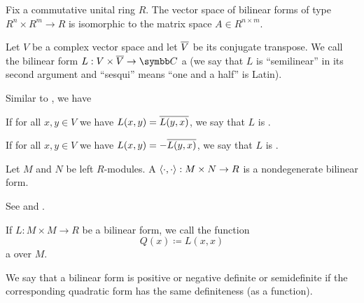 \begin{corollary}\label{thm:bilinear_forms_isomorphic_to_matrices}
  Fix a commutative unital ring \( R \). The vector space of bilinear forms of type \( R^n \times R^m \to R \) is isomorphic to the matrix space \( A \in R^{n \times m} \).
\end{corollary}

\begin{definition}\label{def:sesquilinear_form}\cite[258]{Knapp2016BAlg}
  Let \( V \) be a complex vector space and let \( \overline{V} \) be its conjugate transpose. We call the bilinear form \( L: V \times \Ol V \to \BC \) a  (we say that \( L \) is \enquote{semilinear} in its second argument and \enquote{sesqui} means \enquote{one and a half} is Latin).

  Similar to , we have
  \begin{defenum}
     If for all \( x, y \in V \) we have \( L(x, y) = \overline{L(y, x)} \), we say that \( L \) is .

     If for all \( x, y \in V \) we have \( L(x, y) = -\overline{L(y, x)} \), we say that \( L \) is .
  \end{defenum}
\end{definition}

\begin{definition}\label{def:duality_pairing}
  Let \( M \) and \( N \) be left \( R \)-modules. A  \( \left\langle \cdot, \cdot \right\rangle: M \times N \to R \) is a nondegenerate bilinear form.

  See  and .
\end{definition}

\begin{definition}\label{def:quadratic_form}
  If \( L: M \times M \to R \) be a bilinear form, we call the function
  \begin{equation*}
    Q(x) \coloneqq L(x, x)
  \end{equation*}
  a  over \( M \).
\end{definition}

\begin{definition}\label{def:quadratic_form_definiteness}
  We say that a bilinear form is positive or negative definite or semidefinite if the corresponding quadratic form has the same definiteness (as a function).
\end{definition}

